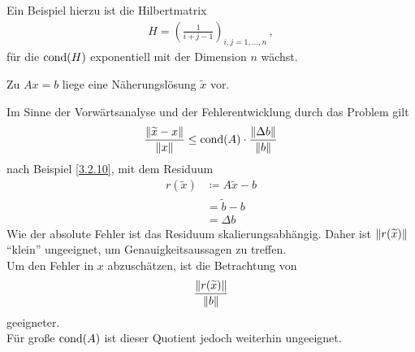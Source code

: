 Ein Beispiel hierzu ist die Hilbertmatrix
\begin{gather*}
  H  =  \left( \frac{1}{i + j -1 } \right)_{i,j= 1,\ldots, n}\, ,
\end{gather*}
für die $\operatorname{cond} ( H)$ exponentiell mit der Dimension $n$ wächst.


Zu $Ax=b$ liege eine Näherungslösung $\widetilde{x}$ vor.


Im Sinne der Vorwärtsanalyse und der Fehlerentwicklung durch das Problem gilt
\begin{gather*}
  \frac{\left\| \widetilde{x}-x \right\|}{\left\| x \right\|} \leq \operatorname{cond}(A) \cdot \frac{\left\| \Delta b \right\|}{\left\| b \right\|}
\end{gather*}
nach Beispiel \ref{3.2.10}, 
mit dem Residuum 
\begin{align}
  r(\widetilde{x})  & \coloneqq A\widetilde{x} - b \label{III.4.1} \\ \nonumber 
                    &	= \widetilde{b}-b \\ \nonumber
                    & = \Delta b
\end{align}
Wie der absolute Fehler ist das Residuum skalierungsabhängig.
Daher ist $\left\| r(\widetilde{x}) \right\|$ \enquote{klein} ungeeignet, um
Genauigkeitsaussagen zu treffen. \\
Um den Fehler in $x$ abzuschätzen, ist die Betrachtung von 
\begin{gather}
  \frac{\left\| r(\widetilde{x}) \right\|}{\left\| b \right\|} \label{III.4.2}
\end{gather}
geeigneter. \\
Für große $\operatorname{cond}(A)$ ist dieser Quotient jedoch weiterhin ungeeignet.

